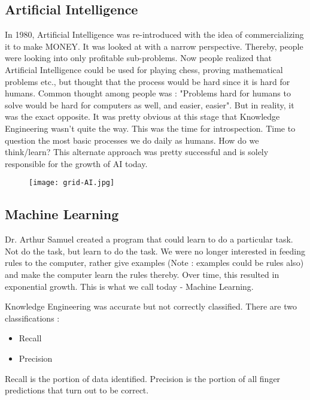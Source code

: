 \documentclass[a4paper]{article}
\begin{document}
\subsection{Artificial Intelligence}

In 1980, Artificial Intelligence was re-introduced with the idea of commercializing it to make MONEY. It was looked at with a narrow perspective. Thereby, people were looking into only profitable sub-problems.
Now people realized that Artificial Intelligence could be used for playing chess, proving mathematical problems etc., but thought that the process would be hard since it is hard for humans. 
Common thought among people was : "Problems hard for humans to solve would be hard for computers as well, and easier, easier". But in reality, it was the exact opposite. 
It was pretty obvious at this stage that Knowledge Engineering wasn't quite the way. 
This was the time for introspection. Time to question the most basic processes we do daily as humans. How do we think/learn? 
This alternate approach was pretty successful and is solely responsible for the growth of AI today. 


\begin{figure}
\centering
\texttt{[image: grid-AI.jpg]}
\caption{\label{Fig 1 : Artificial Intelligence}}
\end{figure}

\subsection{Machine Learning}

Dr. Arthur Samuel created a program that could learn to do a particular task. Not do the task, but learn to do the task. We were no longer interested in feeding rules to the computer, rather give examples (Note : examples could be rules also) and make the computer learn the rules thereby.  Over time, this resulted in exponential growth. This is what we call today - Machine Learning.

Knowledge Engineering was accurate but not correctly classified.
There are two classifications : 
\begin{itemize}
\item Recall
\end{itemize}
\begin{itemize}
\item Precision
\end{itemize}

Recall is the portion of data identified.
Precision is the portion of all finger predictions that turn out to be correct. 
\end{document}
